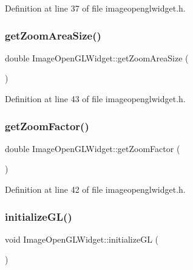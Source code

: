 Definition at line 37 of file imageopenglwidget.\+h.

\mbox{\label{class_image_open_g_l_widget_a08f939efcfeeee4d0b39562f78a0cd79}} 
\subsubsection{\texorpdfstring{getZoomAreaSize()}{getZoomAreaSize()}}
{\footnotesize\ttfamily double Image\+Open\+G\+L\+Widget\+::get\+Zoom\+Area\+Size (\begin{DoxyParamCaption}{ }\end{DoxyParamCaption})\hspace{0.3cm}{\ttfamily [inline]}}



Definition at line 43 of file imageopenglwidget.\+h.

\mbox{\label{class_image_open_g_l_widget_ab42b2ef0661e973a89fd611a295ba0f2}} 
\subsubsection{\texorpdfstring{getZoomFactor()}{getZoomFactor()}}
{\footnotesize\ttfamily double Image\+Open\+G\+L\+Widget\+::get\+Zoom\+Factor (\begin{DoxyParamCaption}{ }\end{DoxyParamCaption})\hspace{0.3cm}{\ttfamily [inline]}}



Definition at line 42 of file imageopenglwidget.\+h.

\mbox{\label{class_image_open_g_l_widget_a0ee0a04058d97ccf201d5bda36e42e96}} 
\subsubsection{\texorpdfstring{initializeGL()}{initializeGL()}}
{\footnotesize\ttfamily void Image\+Open\+G\+L\+Widget\+::initialize\+GL (\begin{DoxyParamCaption}{ }\end{DoxyParamCaption})\hspace{0.3cm}{\ttfamily [protected]}}




